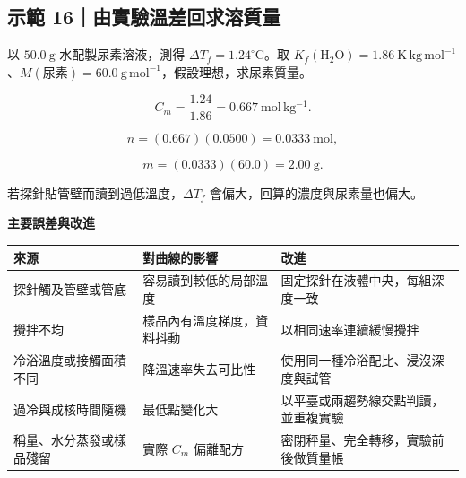 \documentclass[11pt,a4paper]{article}
\newcounter{none}
\begin{document}
\begin{HandoutWorkedExample}

\subsection{示範 16｜由實驗溫差回求溶質量}\label{ux793aux7bc4-16ux7531ux5be6ux9a57ux6eabux5deeux56deux6c42ux6eb6ux8ceaux91cf}

以 \(50.0\ \mathrm g\) 水配製尿素溶液，測得 \(\Delta T_f=1.24^\circ\mathrm C\)。取 \(K_f(\mathrm{H_2O})=1.86\ \mathrm{K\,kg\,mol^{-1}}\)、\(M(\text{尿素})=60.0\ \mathrm{g\,mol^{-1}}\)，假設理想，求尿素質量。

\[
C_m=\frac{1.24}{1.86}=0.667\ \mathrm{mol\,kg^{-1}}.
\]

\[
n=(0.667)(0.0500)=0.0333\ \mathrm{mol},
\]

\[
m=(0.0333)(60.0)=2.00\ \mathrm g.
\]

若探針貼管壁而讀到過低溫度，\(\Delta T_f\) 會偏大，回算的濃度與尿素量也偏大。

\end{HandoutWorkedExample}

\textbf{主要誤差與改進}

{\def\LTcaptype{none} %
\begin{longtable}[]{@{}
  >{\raggedright\arraybackslash}p{}
  >{\raggedright\arraybackslash}p{}
  >{\raggedright\arraybackslash}p{}@{}}
\toprule\noalign{}
\begin{minipage}[b]{\linewidth}\raggedright
來源
\end{minipage} & \begin{minipage}[b]{\linewidth}\raggedright
對曲線的影響
\end{minipage} & \begin{minipage}[b]{\linewidth}\raggedright
改進
\end{minipage} \\
\midrule\noalign{}
\endhead
\bottomrule\noalign{}
\endlastfoot
探針觸及管壁或管底 & 容易讀到較低的局部溫度 & 固定探針在液體中央，每組深度一致 \\
攪拌不均 & 樣品內有溫度梯度，資料抖動 & 以相同速率連續緩慢攪拌 \\
冷浴溫度或接觸面積不同 & 降溫速率失去可比性 & 使用同一種冷浴配比、浸沒深度與試管 \\
過冷與成核時間隨機 & 最低點變化大 & 以平臺或兩趨勢線交點判讀，並重複實驗 \\
稱量、水分蒸發或樣品殘留 & 實際 \(C_m\) 偏離配方 & 密閉秤量、完全轉移，實驗前後做質量帳 \\
\end{longtable}
}
\end{document}
